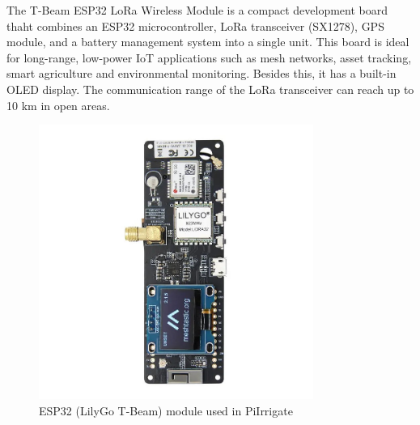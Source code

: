 The T-Beam ESP32 LoRa Wireless Module is a compact development board thaht combines an ESP32 microcontroller,
LoRa transceiver (SX1278), GPS module, and a battery management system into a single unit. This board is ideal
for long-range, low-power IoT applications such as mesh networks, asset tracking, smart agriculture and environmental
monitoring. Besides this, it has a built-in OLED display. The communication range of the LoRa transceiver can reach up to 10 km in open areas.
\begin{figure}[H]
    \centering
    \includegraphics[width=0.8\textwidth]{images/esp32lora.jpg}
    \caption{ESP32 (LilyGo T-Beam) module used in PiIrrigate}
    \label{fig:esp32lora}
\end{figure}

